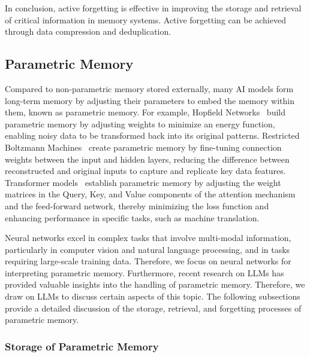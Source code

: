 \documentclass[journal,hideappendix]{vgtc}
\begin{document}
In conclusion, active forgetting is effective in improving the storage and retrieval of critical information in memory systems. Active forgetting can be achieved through data compression and deduplication.


\subsection{Parametric Memory}
\label{sec:AI_memory:parametric}

Compared to non-parametric memory stored externally, many AI models form long-term memory by adjusting their parameters to embed the memory within them, known as parametric memory. For example, Hopfield Networks~\cite{hopfield1982neural, ramsauer2020hopfield} build parametric memory by adjusting weights to minimize an energy function, enabling noisy data to be transformed back into its original patterns. Restricted Boltzmann Machines~\cite{hinton2007learning, nair2010rectified, hinton2010practical} create parametric memory by fine-tuning connection weights between the input and hidden layers, reducing the difference between reconstructed and original inputs to capture and replicate key data features. Transformer models~\cite{vaswani2017attention} establish parametric memory by adjusting the weight matrices in the Query, Key, and Value components of the attention mechanism and the feed-forward network, thereby minimizing the loss function and enhancing performance in specific tasks, such as machine translation.

Neural networks excel in complex tasks that involve multi-modal information, particularly in computer vision and natural language processing, and in tasks requiring large-scale training data. Therefore, we focus on neural networks for interpreting parametric memory. Furthermore, recent research on LLMs has provided valuable insights into the handling of parametric memory. Therefore, we draw on LLMs to discuss certain aspects of this topic. The following subsections provide a detailed discussion of the storage, retrieval, and forgetting processes of parametric memory.

\subsubsection{Storage of Parametric Memory}
\label{sec:AI_memory:parametric:storage}
\end{document}
